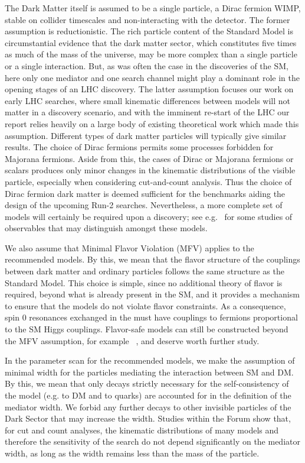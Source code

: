 The Dark Matter itself is assumed to be a single particle, a Dirac
fermion WIMP, stable on collider timescales and non-interacting with
the detector. The former assumption is reductionistic. The rich
particle content of the Standard Model is circumstantial evidence that
the dark matter sector, which constitutes five times as much of the
mass of the universe, may be more complex than a single particle or a
single interaction. But, as was often the case in the discoveries of
the SM, here only one mediator and one search channel might play a
dominant role in the opening stages of an LHC discovery. The latter
assumption focuses our work on early LHC searches, where small
kinematic differences between models will not matter in a discovery
scenario, and with the imminent re-start of the LHC our report relies
heavily on a large body of existing theoretical work which made this
assumption. Different types of dark matter particles will typically
give similar results. The choice of Dirac fermions permits some
processes forbidden for Majorana fermions. Aside from this, the cases
of Dirac or Majorana fermions or scalars produces only minor changes
in the kinematic distributions of the visible particle, especially
when considering cut-and-count analysis. Thus the choice of Dirac
fermion dark matter is deemed sufficient for the benchmarks aiding the
design of the upcoming Run-2 searches. Nevertheless, a more complete
set of models will certainly be required upon a discovery; see
e.g.~\cite{Cotta:2012nj,Haisch:2013fla,Crivellin:2015wva,} for some
studies of observables that may distinguish amongst these models.

We also assume that Minimal Flavor Violation (MFV) \cite{Chivukula:1987py,Hall:1990ac,Buras:2000dm,D'Ambrosio:2002ex} applies to the
recommended models. By this, we mean that the flavor structure of the
couplings between dark matter and ordinary particles follows the same
structure as the Standard Model. This choice is simple, since no
additional theory of flavor is required, beyond what is already
present in the SM, and it provides a mechanism to ensure that the
models do not violate flavor constraints.  As a consequence, spin 0
resonances exchanged in the \schannel must have couplings to fermions proportional to the SM Higgs couplings. Flavor-safe models can still be constructed beyond the MFV
assumption, for example ~\cite{Agrawal:2014aoa}, and deserve worth further study.

In the parameter scan for the recommended models, we make the
assumption of minimal width for the particles mediating the
interaction between SM and DM.  By this, we mean that only decays
strictly necessary for the self-consistency of the model (e.g.  to DM
and to quarks) are accounted for in the definition of the mediator
width. We forbid any further decays to other invisible particles of
the Dark Sector that may increase the width. Studies within the Forum
show that, for cut and count analyses, the kinematic distributions of
many models and therefore the sensitivity of the search do not depend
significantly on the mediator width, as long as the width remains less
than the mass of the particle.

